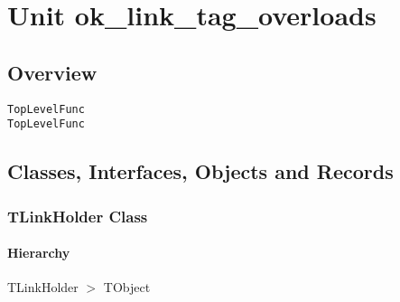 \documentclass{report}
\newif\ifpdf
\begin{document}
\label{toc}\tableofcontents
\newpage
\newlength{\tmplength}
\chapter{Unit ok{\_}link{\_}tag{\_}overloads}
\label{ok_link_tag_overloads}
\section{Overview}
\begin{description}
\item[\texttt{\begin{ttfamily}TLinkHolder\end{ttfamily} Class}]
\item[\texttt{\begin{ttfamily}TOverloadedBase\end{ttfamily} Class}]
\item[\texttt{\begin{ttfamily}TOverloadedMethods\end{ttfamily} Class}]
\end{description}
\begin{description}
\item[\texttt{TopLevelFunc}]
\item[\texttt{TopLevelFunc}]
\end{description}
\section{Classes, Interfaces, Objects and Records}
\ifpdf
\subsection*{\large{\textbf{TLinkHolder Class}}\normalsize\hspace{1ex}\hrulefill}
\else
\subsection*{TLinkHolder Class}
\fi
\label{ok_link_tag_overloads.TLinkHolder}
\subsubsection*{\large{\textbf{Hierarchy}}\normalsize\hspace{1ex}\hfill}
TLinkHolder {$>$} TObject
\end{document}

